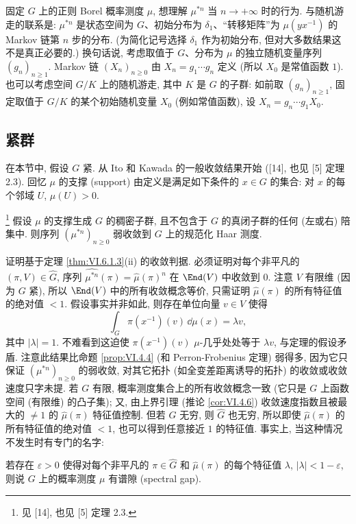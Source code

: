 固定 $G$ 上的正则 Borel 概率测度 $\mu$, 想理解 $\mu^{*n}$ 当 $n \to +\infty$ 时的行为.
与随机游走的联系是: $\mu^{*n}$ 是状态空间为 $G$、初始分布为 $\delta_1$、``转移矩阵''为 $\mu(yx^{-1})$ 的 Markov 链第 $n$ 步的分布. (为简化记号选择 $\delta_1$ 作为初始分布, 但对大多数结果这不是真正必要的.) 换句话说, 考虑取值于 $G$、分布为 $\mu$ 的独立随机变量序列 $(g_n)_{n \geq 1}$. Markov 链 $(X_n)_{n \geq 0}$ 由 $X_n = g_1\cdots g_n$ 定义 (所以 $X_0$ 是常值函数 $1$). 也可以考虑空间 $G/K$ 上的随机游走, 其中 $K$ 是 $G$ 的子群: 如前取 $(g_n)_{n \geq 1}$, 固定取值于 $G/K$ 的某个初始随机变量 $X_0$ (例如常值函数), 设 $X_n = g_n\cdots g_1X_0$.

\subsection{紧群}
在本节中, 假设 $G$ 紧. 从 Ito 和 Kawada 的一般收敛结果开始 ({[}14{]}, 也见 {[}5{]} 定理 2.3).
回忆 $\mu$ 的支撑 (support) 由定义是满足如下条件的 $x \in G$ 的集合: 对 $x$ 的每个邻域 $U$, $\mu(U) > 0$.

\begin{theorem}\footnote{见 {[}14{]}, 也见 {[}5{]} 定理 2.3.}
\label{thm:VI.6.3.1}
假设 $\mu$ 的支撑生成 $G$ 的稠密子群, 且不包含于 $G$ 的真闭子群的任何 (左或右) 陪集中. 则序列 $(\mu^{*n})_{n \geq 0}$ 弱收敛到 $G$ 上的规范化 Haar 测度.
\end{theorem}

证明基于定理 \ref{thm:VI.6.1.3}(ii) 的收敛判据. 必须证明对每个非平凡的 $(\pi, V) \in \widehat{G}$, 序列 $\widehat{\mu^{*n}}(\pi) = \hat{\mu}(\pi)^n$ 在 $\End(V)$ 中收敛到 $0$. 注意 $V$ 有限维 (因为 $G$ 紧), 所以 $\End(V)$ 中的所有收敛概念等价, 只需证明 $\hat{\mu}(\pi)$ 的所有特征值的绝对值 $< 1$. 假设事实并非如此, 则存在单位向量 $v \in V$ 使得
\[
\int_G\pi(x^{-1})(v)\,\dd\mu(x) = \lambda v,
\]
其中 $|\lambda| = 1$. 不难看到这迫使 $\pi(x^{-1})(v)$ $\mu$-几乎处处等于 $\lambda v$, 与定理的假设矛盾.
注意此结果比命题 \ref{prop:VI.4.4} (和 Perron-Frobenius 定理) 弱得多, 因为它只保证 $(\mu^{*n})_{n \geq 0}$ 的弱收敛, 对其它拓扑 (如全变差距离诱导的拓扑) 的收敛或收敛速度只字未提. 若 $G$ 有限, 概率测度集合上的所有收敛概念一致 (它只是 $G$ 上函数空间 (有限维) 的凸子集); 又, 由上界引理 (推论 \ref{cor:VI.4.6}) 收敛速度指数且被最大的 $\neq 1$ 的 $\hat{\mu}(\pi)$ 特征值控制. 但若 $G$ 无穷, 则 $\widehat{G}$ 也无穷, 所以即使 $\hat{\mu}(\pi)$ 的所有特征值的绝对值 $< 1$, 也可以得到任意接近 $1$ 的特征值. 事实上, 当这种情况不发生时有专门的名字:

\begin{definition}
\label{def:VI.6.3.2}
若存在 $\varepsilon > 0$ 使得对每个非平凡的 $\pi \in \widehat{G}$ 和 $\hat{\mu}(\pi)$ 的每个特征值 $\lambda$, $|\lambda| < 1 - \varepsilon$, 则说 $G$ 上的概率测度 $\mu$ 有谱隙 (spectral gap).
\end{definition}


